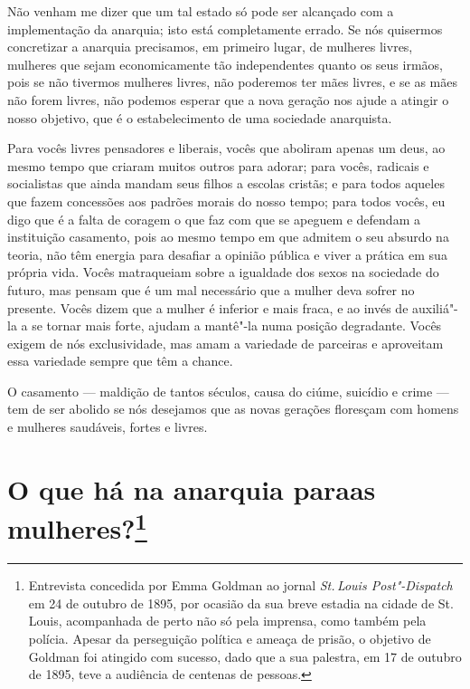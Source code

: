 Não venham me dizer que um tal estado só pode ser alcançado com a
implementação da anarquia; isto está completamente errado. Se nós
quisermos concretizar a anarquia precisamos, em primeiro lugar, de mulheres livres, mulheres que sejam economicamente tão
independentes quanto os seus irmãos, pois se não tivermos mulheres
livres, não poderemos ter mães livres, e se as mães não forem livres,
não podemos esperar que a nova geração nos ajude a atingir o nosso
objetivo, que é o estabelecimento de uma sociedade anarquista.

Para vocês livres pensadores e liberais, vocês que aboliram apenas um deus, ao mesmo tempo que criaram muitos outros para adorar; para vocês, radicais e
socialistas que ainda mandam seus filhos a escolas cristãs; e para
todos aqueles que fazem concessões aos padrões morais do nosso tempo;
para todos vocês, eu digo que é a falta de coragem o que faz com que
se apeguem e defendam a instituição casamento, pois ao mesmo tempo
em que admitem o seu absurdo na teoria, não têm energia para
desafiar a opinião pública e viver a prática em sua própria vida. Vocês
matraqueiam sobre a igualdade dos sexos na sociedade do futuro, mas
pensam que é um mal necessário que a mulher deva sofrer no presente.
Vocês dizem que a mulher é inferior e mais fraca, e ao invés de
auxiliá"-la a se tornar mais forte, ajudam a mantê"-la numa posição
degradante. Vocês exigem de nós exclusividade, mas amam a variedade de
parceiras e aproveitam essa variedade sempre que têm a chance.

O casamento --- maldição de tantos séculos, causa do ciúme, suicídio e
crime --- tem de ser abolido se nós desejamos que as novas gerações
floresçam com homens e mulheres saudáveis, fortes e livres.

\chapter[O que há na anarquia para as mulheres?]{O que há na anarquia para\break as mulheres?\footnote{Entrevista concedida por Emma Goldman
  ao jornal \emph{St.\,Louis Post"-Dispatch} em 24 de outubro de 1895, por
  ocasião da sua breve estadia na cidade de St.\,Louis, acompanhada de
  perto não só pela imprensa, como também pela polícia. Apesar da
  perseguição política e ameaça de prisão, o objetivo de Goldman foi
  atingido com sucesso, dado que a sua palestra, em 17 de outubro de
  1895, teve a audiência de centenas de pessoas.}}

\setlength{\epigraphwidth}{.65\textwidth}
\begin{epigraphs} 
\end{epigraphs} 

